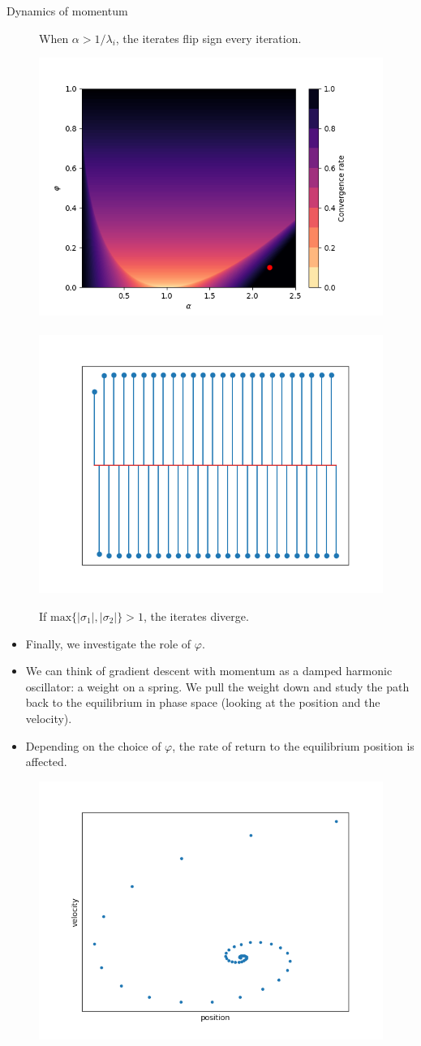 \documentclass[11pt,compress,t,notes=noshow, xcolor=table]{beamer}
\begin{document}
\begin{vbframe}{Dynamics of momentum}
\begin{figure}
	\begin{footnotesize} 
		When $\alpha > 1/\lambda_i$, the iterates flip sign every iteration. 
	\end{footnotesize}
\end{figure}
\framebreak
\vspace*{1.0cm}
\begin{figure}
	\includegraphics[height=0.35\textwidth, keepaspectratio]{figure_man/momentum_conv_div.png} ~~ \includegraphics[height=0.35\textwidth, keepaspectratio]{figure_man/momentum_div.png} \\
	\begin{footnotesize} 
		If  $\text{max} \{|\sigma_1|, |\sigma_2| \} > 1$, the iterates diverge. 
	\end{footnotesize}
\end{figure}

\framebreak
\begin{itemize}
	\item Finally, we investigate the role of $\varphi$. 
	\item We can think of gradient descent with momentum as a damped harmonic oscillator: a weight on a spring. We pull the weight down and study the path back to the equilibrium in phase space (looking at the position and the velocity). 
	\item Depending on the choice of $\varphi$, the rate of return to the equilibrium position is affected. 
\end{itemize}

\begin{figure}
	\includegraphics[height=0.35\textwidth, keepaspectratio]{figure_man/phasespace_underdamping.png} 
\end{figure}


\end{vbframe}
\end{document}

